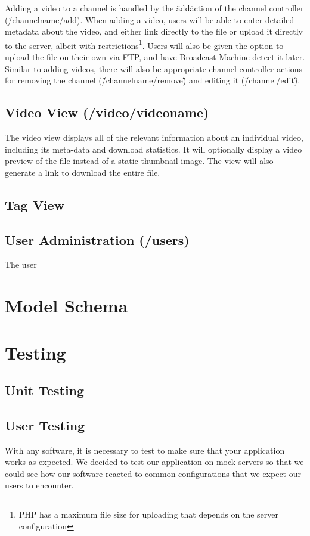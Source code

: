 \documentclass[a4paper,12pt]{report}
\begin{document}
Adding a video to a channel is handled by the \"add\" action of the channel controller (\"/channelname/add\").
When adding a video, users will be able to enter detailed metadata about the video, and either link directly to the file or upload it directly to the server, albeit with restrictions\footnote{PHP has a maximum file size for uploading that depends on the server configuration}.
Users will also be given the option to upload the file on their own via FTP, and have Broadcast Machine detect it later.
Similar to adding videos, there will also be appropriate channel controller actions for removing the channel (\"/channelname/remove\") and editing it (\"/channel/edit\").


\subsection{Video View (/video/videoname) }
The video view displays all of the relevant information about an individual video, including its meta-data and download statistics.
It will optionally display a video preview of the file instead of a static thumbnail image. The view will also generate a link to download the entire file.

\subsection{Tag View}

\subsection{User Administration (/users) }
The user

\section{Model Schema}

\section{Testing}

\subsection{Unit Testing}

\subsection{User Testing}
With any software, it is necessary to test to make sure that your application works as expected.
We decided to test our application on mock servers so that we could see how our software reacted to common configurations that we expect our users to encounter.
\end{document}
